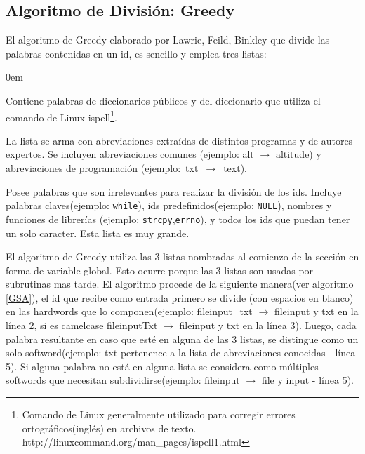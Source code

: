 \documentclass[a4paper,12pt]{report}
\begin{document}

\subsection{Algoritmo de División: Greedy}

El algoritmo de Greedy elaborado por Lawrie, Feild, Binkley\cite{DLFB06,FBL06,HDD06,LFBEX07,EHPV09} que divide las palabras contenidas en un id, es sencillo y emplea tres listas:
\begin{description}
\itemsep0em%
\item[Palabras de diccionarios:] Contiene palabras de diccionarios públicos y del diccionario que utiliza el comando de Linux \textsf{ispell}\footnote[1]{Comando de Linux generalmente utilizado para corregir errores ortográficos(inglés) en archivos de texto. http://linuxcommand.org/man\_pages/ispell1.html}.

\item[Abreviaciones conocidas:] La lista se arma con abreviaciones extraídas de distintos programas y de autores expertos. Se incluyen abreviaciones comunes (ejemplo: \textsf{alt} $\rightarrow$ \textsf{altitude}) y abreviaciones de programación \mbox{(ejemplo: \textsf{txt} $\rightarrow$ \textsf{text}).}

\item[Palabras excluyentes(stop list):] Posee palabras que son irrelevantes para realizar la división de los ids. Incluye palabras claves(ejemplo: \texttt{while}), ids predefinidos(ejemplo: \texttt{NULL}), nombres y funciones de librerías (ejemplo: \texttt{strcpy},\texttt{errno}), y todos los ids que puedan tener un solo caracter. Esta lista es muy grande.
\end{description}

El algoritmo de Greedy utiliza las 3 listas nombradas al comienzo de la sección en forma de variable global. Esto ocurre porque las 3 listas son usadas por subrutinas mas tarde. El algoritmo procede de la siguiente manera(ver algoritmo \ref{GSA}), el id que recibe como entrada primero se divide (con espacios en blanco) en las hardwords que lo componen(ejemplo: \textsf{fileinput\_txt} $\rightarrow$ \mbox{\textsf{fileinput}} y \textsf{txt} en la línea 2, si es camelcase \textsf{fileinputTxt} $\rightarrow$ \textsf{fileinput} y \textsf{txt} en la línea 3). Luego, cada palabra resultante en caso que esté en alguna de las 3 listas, se distingue como un solo softword(ejemplo: \textsf{txt} pertenence a la lista de abreviaciones conocidas - línea 5). Si alguna palabra no está en alguna lista se considera como múltiples softwords que necesitan subdividirse(ejemplo: \textsf{fileinput} $\rightarrow$ \textsf{file} y \textsf{input} - línea 5). 
\end{document}
